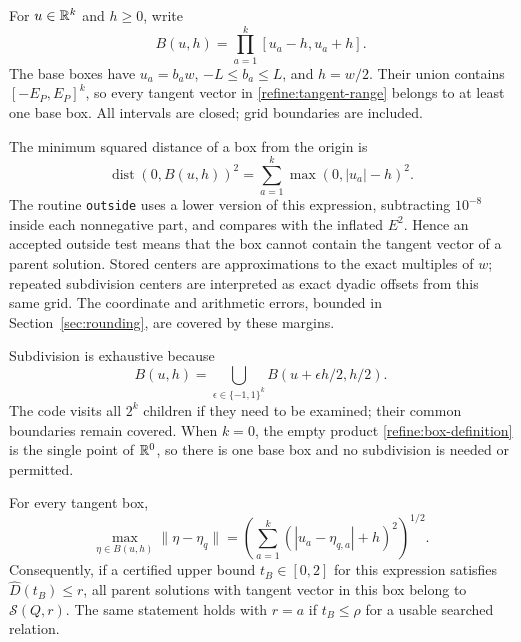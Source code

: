 For $u\in\mathbb R^k$ and $h\geq0$, write
\begin{equation}\label{refine:box-definition}
 B(u,h)=\prod_{a=1}^k[u_a-h,u_a+h].
\end{equation}
The base boxes have $u_a=b_aw$, $-L\leq b_a\leq L$, and $h=w/2$.
Their union contains $[-E_P,E_P]^k$, so every tangent vector in
\eqref{refine:tangent-range} belongs to at least one base box.  All
intervals are closed; grid boundaries are included.

The minimum squared distance of a box from the origin is
\begin{equation}\label{refine:outside-formula}
 \operatorname{dist}(0,B(u,h))^2
 =\sum_{a=1}^k\max(0,|u_a|-h)^2.
\end{equation}
The routine \texttt{outside} uses a lower version of this expression,
subtracting $10^{-8}$ inside each nonnegative part, and compares with
the inflated $E^2$.  Hence an accepted outside test means that the box
cannot contain the tangent vector of a parent solution.  Stored centers
are approximations to the exact multiples of $w$; repeated subdivision
centers are interpreted as exact dyadic offsets from this same grid.
The coordinate and arithmetic errors, bounded in
Section~\ref{sec:rounding}, are covered by these margins.

Subdivision is exhaustive because
\begin{equation}\label{refine:subdivision}
 B(u,h)=\bigcup_{\epsilon\in\{-1,1\}^k}
         B(u+\epsilon h/2,h/2).
\end{equation}
The code visits all $2^k$ children if they need to be examined; their
common boundaries remain covered.  When $k=0$, the empty product
\eqref{refine:box-definition} is the single point of $\mathbb R^0$, so there
is one base box and no subdivision is needed or permitted.

\begin{lemma}\label{refine:farthest-corner}
For every tangent box,
\begin{equation}\label{refine:corner-formula}
 \max_{\eta\in B(u,h)}\|\eta-\eta_q\|
 =\left(\sum_{a=1}^k(|u_a-\eta_{q,a}|+h)^2\right)^{1/2}.
\end{equation}
Consequently, if a certified upper bound $t_B\in[0,2]$ for this expression
satisfies $\widehat D(t_B)\leq r$, all parent solutions with tangent
vector in this box belong to $\mathcal S(Q,r)$.  The same statement
holds with $r=a$ if $t_B\leq\rho$ for a usable searched relation.
\end{lemma}

